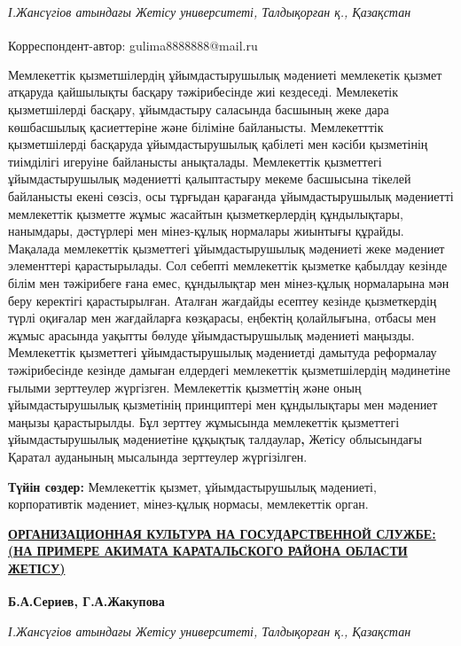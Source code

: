 \emph{І.Жансүгіов атындағы Жетісу университеті, Талдықорған қ.,
Қазақстан}

{\bfseries \textsuperscript{\envelope }}Корреспондент-автор: gulima8888888@mail.ru

Мемлекеттік қызметшілердің ұйымдастырушылық мәдениеті мемлекетік қызмет
атқаруда қайшылықты басқару тәжірибесінде жиі кездеседі. Мемлекетік
қызметшілерді басқару, ұйымдастыру саласында басшының жеке дара
көшбасшылық қасиеттеріне және біліміне байланысты. Мемлекетттік
қызметшілерді басқаруда ұйымдастырушылық қабілеті мен кәсіби қызметінің
тиімділігі игеруіне байланысты анықталады. Мемлекеттік қызметтегі
ұйымдастырушылық мәдениетті қалыптастыру мекеме басшысына тікелей
байланысты екені сөзсіз, осы тұрғыдан қарағанда ұйымдастырушылық
мәдениетті мемлекеттік қызметте жұмыс жасайтын қызметкерлердің
құндылықтары, нанымдары, дәстүрлері мен мінез-құлық нормалары жиынтығы
құрайды. Мақалада мемлекеттік қызметтегі ұйымдастырушылық мәдениеті жеке
мәдениет элементтері қарастырылады. Сол себепті мемлекеттік қызметке
қабылдау кезінде білім мен тәжірибеге ғана емес, құндылықтар мен
мінез-құлық нормаларына мән беру керектігі қарастырылған. Аталған
жағдайды есептеу кезінде қызметкердің түрлі оқиғалар мен жағдайларға
көзқарасы, еңбектің қолайлығына, отбасы мен жұмыс арасында уақытты
бөлуде ұйымдастырушылық мәдениеті маңызды. Мемлекеттік қызметтегі
ұйымдастырушылық мәдениетді дамытуда реформалау тәжірибесінде кезінде
дамыған елдердегі мемлекеттік қызметшілердің мәдинетіне ғылыми
зерттеулер жүргізген. Мемлекеттік қызметтің және оның ұйымдастырушылық
қызметінің принциптері мен құндылықтары мен мәдениет маңызы
қарастырылды. Бұл зерттеу жұмысында мемлекеттік қызметтегі
ұйымдастырушылық мәдениетіне құқықтық талдаулар{\bfseries ,} Жетісу
облысындағы Қаратал ауданының мысалында зерттеулер жүргізілген.

{\bfseries Түйін сөздер:} Мемлекеттік қызмет, ұйымдастырушылық мәдениеті,
корпоративтік мәдениет, мінез-құлық нормасы, мемлекеттік орган.

\href{https://zhetysu.edu.kz/\%D1\%81\%D0\%B5\%D1\%80\%D0\%B8\%D0\%B5\%D0\%B2-\%D0\%B1\%D0\%BE\%D0\%BB\%D0\%B0\%D1\%82-\%D0\%B0\%D0\%B1\%D0\%B4\%D1\%83\%D0\%BB\%D0\%B4\%D0\%B0\%D2\%B1\%D0\%BB\%D1\%8B/}{{\bfseries ОРГАНИЗАЦИОННАЯ
КУЛЬТУРА НА ГОСУДАРСТВЕННОЙ СЛУЖБЕ: (НА ПРИМЕРЕ АКИМАТА КАРАТАЛЬСКОГО
РАЙОНА ОБЛАСТИ ЖЕТІСУ)}}

{\bfseries Б.А.Сериев, Г.А.Жакупова\textsuperscript{\envelope }}

\emph{І.Жансүгіов атындағы Жетісу университеті, Талдықорған қ.,
Қазақстан}

